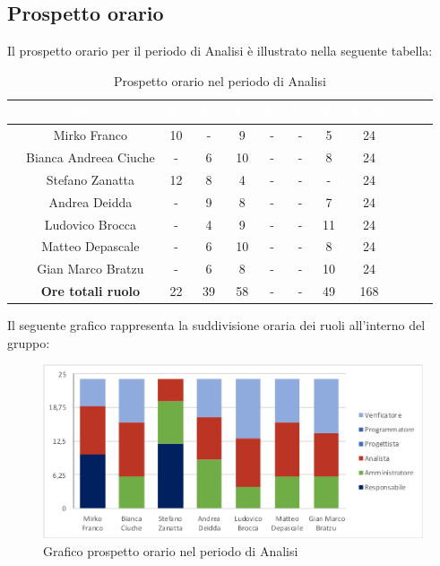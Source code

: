 \subsection{Prospetto orario}
Il prospetto orario per il periodo di Analisi è illustrato nella seguente tabella:

\begin{table}[ht]
	\begin{center}
		\begin{tabular}{cccccccccccc}
			\rowcolor{coolblack}
			\hline 
			& \textcolor{white}{Nome} & \textcolor{white}{Re} & \textcolor{white}{Am} & \textcolor{white}{An} & \textcolor{white}{Pt} &\textcolor{white}{Pr} & \textcolor{white}{Ve} & \textcolor{white}{Totale} \\
			\hline
			
			&Mirko Franco          & 10 & - & 9 & - & - & 5 &24  \\
			&Bianca Andreea Ciuche        & -  & 6 & 10 & - & - & 8 & 24 \\
			&Stefano Zanatta     & 12& 8 & 4 & - & - & - & 24 \\
			&Andrea Deidda       &  -& 9 & 8 & - & - & 7 & 24 \\
			&Ludovico Brocca    & -& 4 & 9 & - & - & 11 & 24 \\
			&Matteo Depascale  & -& 6& 10 & - & - & 8 & 24 \\
			&Gian Marco Bratzu & -& 6 & 8 & - & - & 10 & 24 \\
			\hline
			&\textbf{Ore totali ruolo} & 22 & 39 & 58 & - & - & 49 & 168 \\
		\end{tabular}
		\caption{Prospetto orario nel periodo di Analisi}
	\end{center}
\end{table}

Il seguente grafico rappresenta la suddivisione oraria dei ruoli all'interno del gruppo:
\begin{figure}[!ht]
	\begin{center}
		\includegraphics[scale=0.90]{images/grafoProspettoOrario.png}
		\caption{Grafico prospetto orario nel periodo di Analisi}
	\end{center}
\end{figure}

